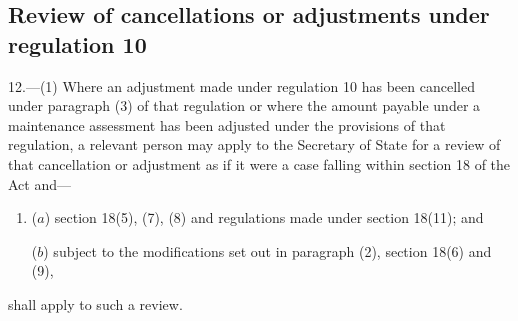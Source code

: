 \documentclass[12pt,a4paper]{article}
\begin{document}
%
%
%
%


\subsection[12. Review of cancellations or adjustments under regulation 10]{Review of cancellations or adjustments under regulation 10}

\begin{sloppypar}
12.—(1) Where an adjustment made under regulation 10 has been cancelled under paragraph (3) of that regulation or where the amount payable under a maintenance assessment has been adjusted under the provisions of that regulation, a relevant person may apply to the Secretary of State for a review of that cancellation or adjustment as if it were a case falling within section 18 of the Act and—
\end{sloppypar}
\begin{enumerate}\item[]
($a$) section 18(5), (7), (8) and regulations made under section 18(11); and

($b$) subject to the modifications set out in paragraph (2), section 18(6) and (9),
\end{enumerate}
shall apply to such a review.
\end{document}
